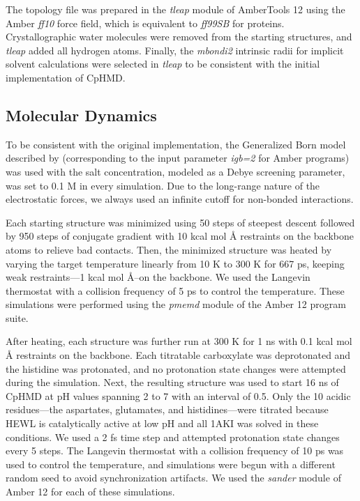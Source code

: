 The topology file was prepared in the \emph{tleap} module of AmberTools 12 using
the Amber \emph{ff10} force field, which is equivalent to \emph{ff99SB}
\cite{Hornak2006} for proteins.  Crystallographic water molecules were removed
from the starting structures, and \emph{tleap} added all hydrogen atoms.
Finally, the \emph{mbondi2} intrinsic radii for implicit solvent calculations
were selected in \emph{tleap} to be consistent with the initial implementation
of CpHMD. \cite{Mongan2004}

\subsection{Molecular Dynamics}

To be consistent with the original implementation, the Generalized Born model
described by \citeauthor{Onufriev2004} \cite{Onufriev2004} (corresponding to the
input parameter \emph{igb=2} for Amber programs) was used with the salt
concentration, modeled as a Debye screening parameter, was set to 0.1 M in every
simulation.  \cite{Mongan2004}  Due to the long-range nature of the
electrostatic forces, we always used an infinite cutoff for non-bonded
interactions.

Each starting structure was minimized using 50 steps of steepest descent
followed by 950 steps of conjugate gradient with 10 kcal mol
\AA{}  restraints on the backbone atoms to relieve bad contacts.  Then,
the minimized structure was heated by varying the target temperature linearly
from 10 K to 300 K for 667 ps, keeping weak restraints---1 kcal mol
\AA{}--on the backbone.  We used the Langevin thermostat with a
collision frequency of 5 ps to control the temperature.  These
simulations were performed using the \emph{pmemd} module of the Amber 12 program
suite. \cite{AMBER12}

After heating, each structure was further run at 300 K for 1 ns with 0.1 kcal
mol \AA{} restraints on the backbone.  Each titratable
carboxylate was deprotonated and the histidine was protonated, and no
protonation state changes were attempted during the simulation.  Next, the
resulting structure was used to start 16 ns of CpHMD at pH values spanning 2 to
7 with an interval of 0.5.  Only the 10 acidic residues---the aspartates,
glutamates, and histidines---were titrated because HEWL is catalytically active
at low pH \cite{Vocadlo2001} and all 1AKI was solved in these conditions.  We
used a 2 fs time step and attempted protonation state changes every 5 steps.
The Langevin thermostat with a collision frequency of 10 ps was used
to control the temperature, and simulations were begun with a different random
seed to avoid synchronization artifacts. \cite{Sindhikara2009}  We used the
\emph{sander} module of Amber 12 for each of these simulations.

